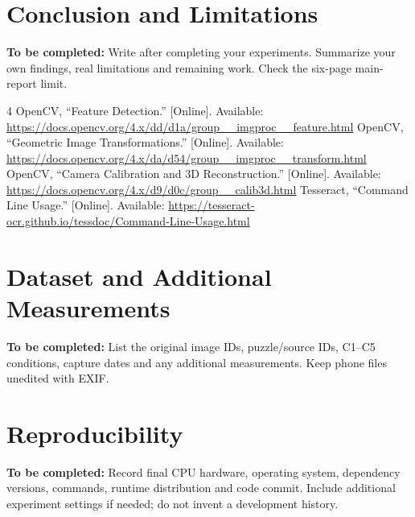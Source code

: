 \documentclass[conference]{IEEEtran}
\newcommand{\draftnote}[1]{\par\noindent\textbf{To be completed:} #1\par}
\begin{document}
\section{Conclusion and Limitations}
\draftnote{Write after completing your experiments. Summarize your own findings,
real limitations and remaining work. Check the six-page main-report limit.}

\begin{thebibliography}{4}
 OpenCV, ``Feature Detection.'' [Online]. Available:
\url{https://docs.opencv.org/4.x/dd/d1a/group__imgproc__feature.html}
 OpenCV, ``Geometric Image Transformations.'' [Online]. Available:
\url{https://docs.opencv.org/4.x/da/d54/group__imgproc__transform.html}
 OpenCV, ``Camera Calibration and 3D Reconstruction.'' [Online]. Available:
\url{https://docs.opencv.org/4.x/d9/d0c/group__calib3d.html}
 Tesseract, ``Command Line Usage.'' [Online]. Available:
\url{https://tesseract-ocr.github.io/tessdoc/Command-Line-Usage.html}
\end{thebibliography}

\appendices
\section{Dataset and Additional Measurements}
\draftnote{List the original image IDs, puzzle/source IDs, C1--C5 conditions,
capture dates and any additional measurements. Keep phone files unedited with EXIF.}

\section{Reproducibility}
\draftnote{Record final CPU hardware, operating system, dependency versions,
commands, runtime distribution and code commit. Include additional experiment
settings if needed; do not invent a development history.}
\end{document}
